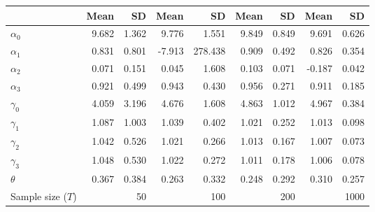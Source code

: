 
\begin{tabular}[t]{lrrrrrrrr}
\toprule
  & Mean & SD & Mean  & SD  & Mean   & SD   & Mean    & SD   \\
\midrule
$\alpha_{0}$ & 9.682 & 1.362 & 9.776 & 1.551 & 9.849 & 0.849 & 9.691 & 0.626\\
$\alpha_{1}$ & 0.831 & 0.801 & -7.913 & 278.438 & 0.909 & 0.492 & 0.826 & 0.354\\
$\alpha_{2}$ & 0.071 & 0.151 & 0.045 & 1.608 & 0.103 & 0.071 & -0.187 & 0.042\\
$\alpha_{3}$ & 0.921 & 0.499 & 0.943 & 0.430 & 0.956 & 0.271 & 0.911 & 0.185\\
$\gamma_{0}$ & 4.059 & 3.196 & 4.676 & 1.608 & 4.863 & 1.012 & 4.967 & 0.384\\
$\gamma_{1}$ & 1.087 & 1.003 & 1.039 & 0.402 & 1.021 & 0.252 & 1.013 & 0.098\\
$\gamma_{2}$ & 1.042 & 0.526 & 1.021 & 0.266 & 1.013 & 0.167 & 1.007 & 0.073\\
$\gamma_{3}$ & 1.048 & 0.530 & 1.022 & 0.272 & 1.011 & 0.178 & 1.006 & 0.078\\
$\theta$ & 0.367 & 0.384 & 0.263 & 0.332 & 0.248 & 0.292 & 0.310 & 0.257\\
Sample size ($T$) &  & 50 &  & 100 &  & 200 &  & 1000\\
\bottomrule
\end{tabular}
